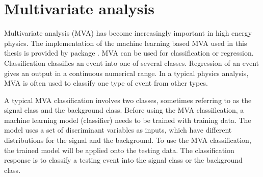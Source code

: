 \section{Multivariate analysis}
\label{sec:pandoraMVA}

Multivariate analysis (MVA) has become increasingly important in high energy physics. The implementation of the machine learning based MVA used in this thesis is provided by  \TMVA package \cite{Hocker:2007ht}.
MVA can be used for classification or regression. Classification classifies an event into one of several classes. Regression of an event  gives an output in a continuous numerical range. In a typical physics analysis, MVA is often used to classify one type of event from other types.



A typical MVA classification involves two classes, sometimes referring to as the signal class and the background class. Before using the MVA classification, a machine learning model (classifier) needs to be trained with training data. The model uses a set of discriminant variables as inputs, which have different distributions for the signal and the background. To use the MVA classification, the trained model will be applied onto the testing data. The classification response is to classify a testing event into the signal class or the background class.

